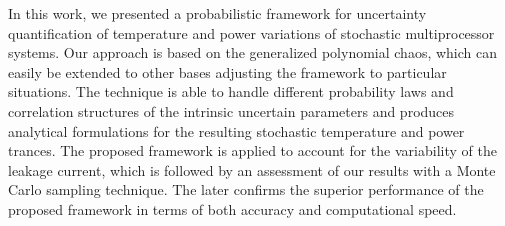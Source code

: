 In this work, we presented a probabilistic framework for uncertainty quantification of temperature and power variations of stochastic multiprocessor systems. Our approach is based on the generalized polynomial chaos, which can easily be extended to other bases adjusting the framework to particular situations. The technique is able to handle different probability laws and correlation structures of the intrinsic uncertain parameters and produces analytical formulations for the resulting stochastic temperature and power trances. The proposed framework is applied to account for the variability of the leakage current, which is followed by an assessment of our results with a Monte Carlo sampling technique. The later confirms the superior performance of the proposed framework in terms of both accuracy and computational speed.
